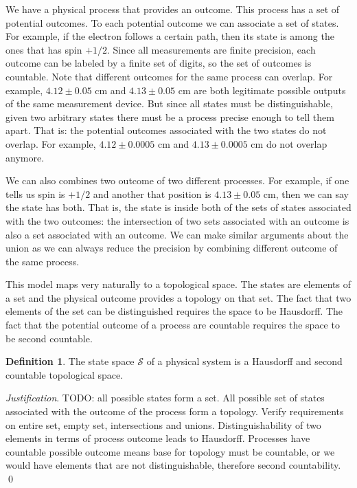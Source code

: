 \documentclass[aps,pra,10pt,twocolumn,floatfix,nofootinbib]{revtex4-1}
\theoremstyle{definition}
\newtheorem{defn}[prop]{Definition}
\newenvironment{justification}{\emph{Justification}.}{\qed}
\begin{document}

We have a physical process that provides an outcome. This process has a set of potential outcomes. To each potential outcome we can associate a set of states. For example, if the electron follows a certain path, then its state is among the ones that has spin $+1/2$. Since all measurements are finite precision, each outcome can be labeled by a finite set of digits, so the set of outcomes is countable. Note that different outcomes for the same process can overlap. For example, $4.12 \pm 0.05$ cm and $4.13 \pm 0.05$ cm are both legitimate possible outputs of the same measurement device. But since all states must be distinguishable, given two arbitrary states there must be a process precise enough to tell them apart. That is: the potential outcomes associated with the two states do not overlap. For example, $4.12 \pm 0.0005$ cm and $4.13 \pm 0.0005$ cm do not overlap anymore.


We can also combines two outcome of two different processes. For example, if one tells us spin is $+1/2$ and another that position is $4.13 \pm 0.05$ cm, then we can say the state has both. That is, the state is inside both of the sets of states associated with the two outcomes: the intersection of two sets associated with an outcome is also a set associated with an outcome. We can make similar arguments about the union as we can always reduce the precision by combining different outcome of the same process.

This model maps very naturally to a topological space. The states are elements of a set and the physical outcome provides a topology on that set. The fact that two elements of the set can be distinguished requires the space to be Hausdorff. The fact that the potential outcome of a process are countable requires the space to be second countable.

\begin{defn}\label{statedef}
The state space $\mathcal{S}$ of a physical system is a Hausdorff and second countable topological space.
\end{defn}

\begin{justification}
TODO: all possible states form a set. All possible set of states associated with the outcome of the process form a topology. Verify requirements on entire set, empty set, intersections and unions. Distinguishability of two elements in terms of process outcome leads to Hausdorff. Processes have countable possible outcome means base for topology must be countable, or we would have elements that are not distinguishable, therefore second countability.
\end{justification}
\end{document}
